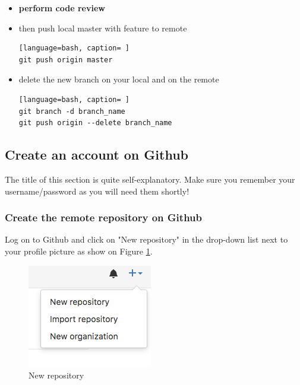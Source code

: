 \begin{itemize}
\item{\textbf{perform code review}}
\item{then push local master with feature to remote}

\begin{lstlisting}[language=bash, caption= ]
git push origin master
\end{lstlisting}

\item{delete the new branch on your local and on the remote}

\begin{lstlisting}[language=bash, caption= ]
git branch -d branch_name
git push origin --delete branch_name
\end{lstlisting}

\end{itemize}

\subsection{Create an account on Github}
The title of this section is quite self-explanatory. Make sure you remember your username/password as you will need them shortly!
\subsubsection{Create the remote repository on Github}
Log on to Github and click on "New repository" in the drop-down list next to your profile picture as show on Figure \ref{fig:new_repo}.
\begin{figure}[H]
\centering
\includegraphics[scale=0.5]{new_repo}
\caption{New repository}
\label{fig:new_repo}
\end{figure}


